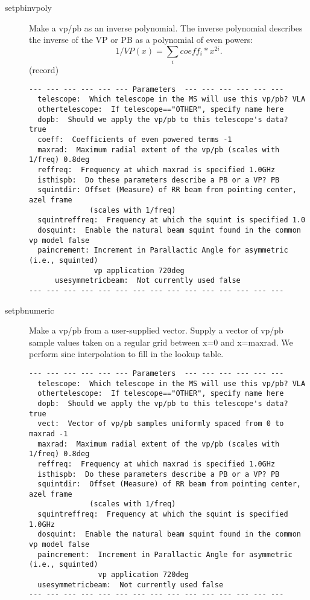 \documentclass[12pt]{article}
\begin{document}
\begin{description}
  \item[setpbinvpoly]
   Make a vp/pb as an inverse polynomial.
   The inverse polynomial describes the inverse of the VP or PB
   as a polynomial of even powers:
   \begin{equation}
     1/VP(x) = \sum_{i} coeff_{i} * x^{2i}.
   \end{equation}
   (record)

{\small
\begin{verbatim}
--- --- --- --- --- --- Parameters  --- --- --- --- --- ---
  telescope:  Which telescope in the MS will use this vp/pb? VLA 
  othertelescope:  If telescope=="OTHER", specify name here 
  dopb:  Should we apply the vp/pb to this telescope's data? true 
  coeff:  Coefficients of even powered terms -1 
  maxrad:  Maximum radial extent of the vp/pb (scales with 1/freq) 0.8deg 
  reffreq:  Frequency at which maxrad is specified 1.0GHz 
  isthispb:  Do these parameters describe a PB or a VP? PB 
  squintdir: Offset (Measure) of RR beam from pointing center, azel frame 
              (scales with 1/freq) 
  squintreffreq:  Frequency at which the squint is specified 1.0 
  dosquint:  Enable the natural beam squint found in the common vp model false 
  paincrement: Increment in Parallactic Angle for asymmetric (i.e., squinted) 
               vp application 720deg 
      usesymmetricbeam:  Not currently used false 
--- --- --- --- --- --- --- --- --- --- --- --- --- --- ---
\end{verbatim} 
}

 
  \item[setpbnumeric]
   Make a vp/pb from a user-supplied vector.
   Supply a vector of vp/pb sample values taken on a regular grid between x=0 and
   x=maxrad.  We perform sinc interpolation to fill in the lookup table.

{\small
\begin{verbatim}
--- --- --- --- --- --- Parameters  --- --- --- --- --- ---
  telescope:  Which telescope in the MS will use this vp/pb? VLA 
  othertelescope:  If telescope=="OTHER", specify name here 
  dopb:  Should we apply the vp/pb to this telescope's data? true 
  vect:  Vector of vp/pb samples uniformly spaced from 0 to maxrad -1 
  maxrad:  Maximum radial extent of the vp/pb (scales with 1/freq) 0.8deg 
  reffreq:  Frequency at which maxrad is specified 1.0GHz 
  isthispb:  Do these parameters describe a PB or a VP? PB 
  squintdir:  Offset (Measure) of RR beam from pointing center, azel frame 
              (scales with 1/freq) 
  squintreffreq:  Frequency at which the squint is specified 1.0GHz 
  dosquint:  Enable the natural beam squint found in the common vp model false 
  paincrement:  Increment in Parallactic Angle for asymmetric (i.e., squinted) 
                vp application 720deg 
  usesymmetricbeam:  Not currently used false 
--- --- --- --- --- --- --- --- --- --- --- --- --- --- ---
\end{verbatim} 
} 


\end{description}
\end{document}

